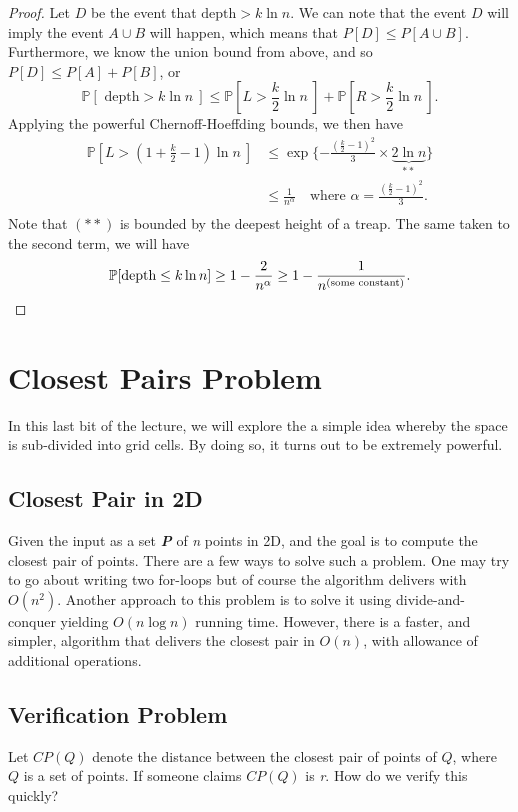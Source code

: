 \documentclass[12pt]{article}
\begin{document}
\begin{proof}
Let $D$ be the event that $\text{depth} >  k\ln{n} $. We can note that the event $D$ will imply the event $A \cup B$ will happen, which means that $P[D] \leq P[A\cup B]$. Furthermore, we know the union bound from above, and so $P[D] \leq P[A] + P[B]$, or 
$$ \mathbb{P}[ \text{ depth} >  k\ln{n} \ ] \leq  \mathbb{P}[ L>  \frac{k}{2}\ln{n} \ ] +  \mathbb{P}[R > \frac{k}{2}\ln{n} \ ].$$
Applying the powerful Chernoff-Hoeffding bounds, we then have
\begin{align*}
 \mathbb{P}[ L >  (1 + \frac{k}{2}-1)\ln{n} \ ] &\leq \exp\{-\frac{(\frac{k}{2}-1)^2}{3} \times \underbrace{2\ln{n}}_{**}\}\\
&\leq \frac{1}{n^\alpha} \quad \text{where } \alpha = \frac{(\frac{k}{2}-1)^2}{3}.\\
\end{align*}
Note that $(**)$ is bounded by the deepest height of a treap. The same taken to the second term, we will have
$$ \mathbb{P}[\textmd{depth} \leq k\ln{n} ] \geq 1-\frac{2}{n^\alpha} \geq 1 - \frac{1}{n^\text{(some constant)}}.$$
\end{proof}

\section{Closest Pairs Problem}

In this last bit of the lecture, we will explore the a simple idea whereby the space is sub-divided into grid cells. By doing so, it turns out to be extremely powerful.
\subsection{Closest Pair in 2D}
Given the input as a set \textbf{\textit{P}} of \textit{n} points in 2D, and the goal is to compute the closest pair of points. There are a few ways to solve such a problem. One may try to go about writing two for-loops but of course the algorithm delivers with $O(n^2)$. Another approach to this problem is to solve it using divide-and-conquer yielding $O(n\log n)$ running time. 
However, there is a faster, and simpler, algorithm that delivers the closest pair in $O(n)$, with allowance of additional operations.

\subsection{Verification Problem}
Let $CP(Q) $ denote  the distance between the closest pair of points of $Q$, where $Q$ is a set of points. If someone claims $CP(Q) $ is \textit{r}. How do we verify this quickly?
\end{document}
